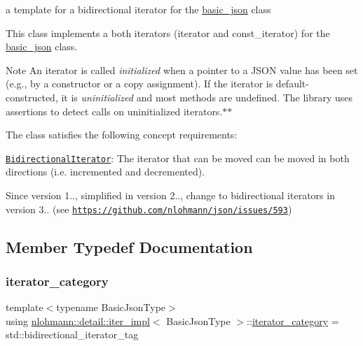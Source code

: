 a template for a bidirectional iterator for the \mbox{\hyperlink{classnlohmann_1_1basic__json}{basic\+\_\+json}} class 

This class implements a both iterators (iterator and const\+\_\+iterator) for the \mbox{\hyperlink{classnlohmann_1_1basic__json}{basic\+\_\+json}} class.

\begin{DoxyNote}{Note}
An iterator is called {\itshape initialized} when a pointer to a J\+S\+ON value has been set (e.\+g., by a constructor or a copy assignment). If the iterator is default-\/constructed, it is {\itshape uninitialized} and most methods are undefined. The library uses assertions to detect calls on uninitialized iterators.$\ast$$\ast$
\end{DoxyNote}
The class satisfies the following concept requirements\+:
\begin{DoxyItemize}
\item \href{http://en.cppreference.com/w/cpp/concept/BidirectionalIterator}{\tt Bidirectional\+Iterator}\+: The iterator that can be moved can be moved in both directions (i.\+e. incremented and decremented).
\end{DoxyItemize}

\begin{DoxySince}{Since}
version 1.., simplified in version 2.., change to bidirectional iterators in version 3.. (see \href{https://github.com/nlohmann/json/issues/593}{\tt https\+://github.\+com/nlohmann/json/issues/593}) 
\end{DoxySince}


\subsection{Member Typedef Documentation}
\mbox{\label{classnlohmann_1_1detail_1_1iter__impl_ad9e091f5c70b34b5b1abc1ab15fd9106}} 
\subsubsection{\texorpdfstring{iterator\+\_\+category}{iterator\_category}}
{\footnotesize\ttfamily template$<$typename Basic\+Json\+Type$>$ \\
using \mbox{\hyperlink{classnlohmann_1_1detail_1_1iter__impl}{nlohmann\+::detail\+::iter\+\_\+impl}}$<$ Basic\+Json\+Type $>$\+::\mbox{\hyperlink{classnlohmann_1_1detail_1_1iter__impl_ad9e091f5c70b34b5b1abc1ab15fd9106}{iterator\+\_\+category}} =  std\+::bidirectional\+\_\+iterator\+\_\+tag}

